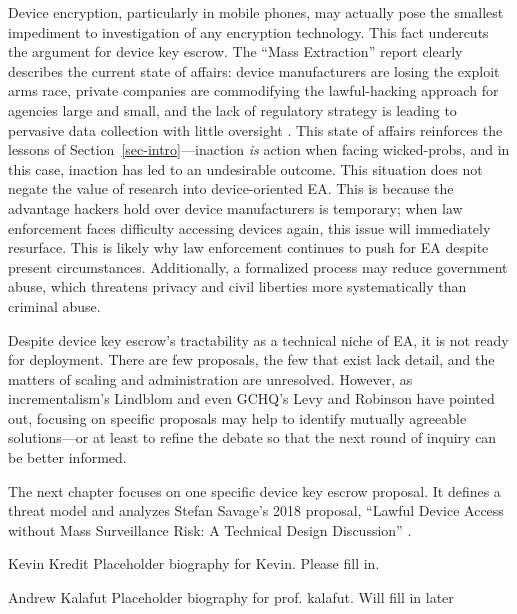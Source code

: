 \documentclass{IEEEtran}
\def\ii#1{\mbox{\textit{#1}}}
\newcommand{\mysec}[1]{Section~\ref{#1}}
\begin{document}
Device encryption, particularly in mobile phones, may actually pose the smallest impediment to investigation of any
encryption technology. This fact undercuts the argument for device key escrow. The ``Mass Extraction'' report clearly
describes the current state of affairs: device manufacturers are losing the exploit arms race, private companies are
commodifying the \ac{lawful-hacking} approach for agencies large and small, and the lack of regulatory strategy is
leading to pervasive data collection with little oversight \cite{koepke_2020}. This state of affairs reinforces the
lessons of \mysec{sec-intro}---inaction \ii{is} action when facing \acp{wicked-prob}, and in this case, inaction has led
to an undesirable outcome. This situation does not negate the value of research into device-oriented \ac{EA}. This is
because the advantage hackers hold over device manufacturers is temporary; when law enforcement faces difficulty
accessing devices again, this issue will immediately resurface. This is likely why law enforcement continues to push for
\ac{EA} despite present circumstances. Additionally, a formalized process may reduce government abuse, which threatens
privacy and civil liberties more systematically than criminal abuse.


Despite device key escrow's tractability as a technical niche of \ac{EA}, it is not ready for deployment. There are few
proposals, the few that exist lack detail, and the matters of scaling and administration are unresolved. However, as
\ac{incrementalism}'s Lindblom and even \ac{GCHQ}'s Levy and Robinson have pointed out, focusing on specific proposals
may help to identify mutually agreeable solutions---or at least to refine the debate so that the next round of inquiry
can be better informed.

The next chapter focuses on one specific device key escrow proposal. It defines a threat model and analyzes Stefan
Savage's 2018 proposal, ``Lawful Device Access without Mass Surveillance Risk: A Technical Design Discussion''
\cite{savage_lawful_2018}.





\begin{IEEEbiography}{Kevin Kredit}
  Placeholder biography for Kevin. Please fill in.
\end{IEEEbiography}

\begin{IEEEbiography}{Andrew Kalafut}
  Placeholder biography for prof. kalafut. Will fill in later 
\end{IEEEbiography}
\end{document}

